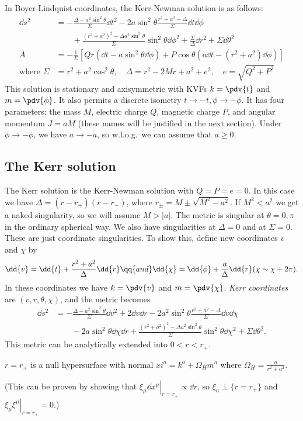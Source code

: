 \documentclass{jknotes}
\begin{document}
In Boyer-Lindquist coordinates, the Kerr-Newman solution is as follows:
\begin{align}
    \dd{s}^2 &= - \frac{\Delta-a^2\sin^2\theta}{\Sigma}\dd{t}^2 - 2a\sin^2\theta\frac{r^2+a^2-\Delta}{\Sigma}\dd{t}\dd{\phi} \\
             &\qquad + \frac{(r^2+a^2)^2 - \Delta a^2\sin^2\theta}{\Sigma}\sin^2\theta\dd{\phi}^2 + \frac{\Sigma}{\Delta}\dd{r}^2 + \Sigma\dd{\theta}^2 \\
    A &= - \frac{1}{\Sigma}\left[Qr(\dd{t}-a\sin^2\theta\dd{\phi}) + P\cos\theta(a\dd{t}-(r^2+a^2)\dd{\phi})\right] \\
    \text{where } \Sigma &= r^2 + a^2\cos^2\theta,\quad \Delta = r^2-2Mr + a^2 + e^2,\quad e=\sqrt{Q^2+P^2}
\end{align}
This solution is stationary and axisymmetric with KVFs \(k=\pdv{t}\) and \(m=\pdv{\phi}\). It also permits a discrete isometry \(t\to-t,\phi\to-\phi\). It has four parameters: the mass \(M\), electric charge \(Q\), magnetic charge \(P\), and angular momentum \(J=aM\) (these names will be justified in the next section). Under \(\phi\to-\phi\), we have \(a\to-a\), so w.l.o.g.\ we can assume that \(a\ge0\).

\subsection{The Kerr solution}
The Kerr solution is the Kerr-Newman solution with \(Q=P=e=0\). In this case we have \(\Delta = (r-r_+)(r-r_-)\), where \(r_\pm = M\pm\sqrt{M^2-a^2}\). If \(M^2<a^2\) we get a naked singularity, so we will assume \(M>|a|\). The metric is singular at \(\theta=0,\pi\) in the ordinary spherical way. We also have singularities at \(\Delta=0\) and at \(\Sigma=0\). These are just coordinate singularities. To show this, define new coordinates \(v\) and \(\chi\) by
\begin{equation}
    \dd{v} = \dd{t}+\frac{r^2+a^2}{\Delta}\dd{r} \qq{and} \dd{\chi}=\dd{\phi} + \frac{a}{\Delta}\dd{r} (\chi\sim\chi+2\pi).
\end{equation}
In these coordinates we have \(k=\pdv{v}\) and \(m=\pdv{\chi}\). \emph{Kerr coordinates} are \((v,r,\theta,\chi)\), and the metric becomes
\begin{align}
    \dd{s}^2 &= - \frac{\Delta-a^2\sin^2\theta}{\Sigma}\dd{v}^2 + 2\dd{v}\dd{r}-2a^2\sin^2\theta\frac{r^2+a^2-\Delta}{\Sigma}\dd{v}\dd{\chi} \\
             &\qquad -2a\sin^2\theta\dd{\chi}\dd{r} + \frac{(r^2+a^2)^2-\Delta a^2\sin^2\theta}{\Sigma}\sin^2\theta\dd{\chi}^2+\Sigma\dd{\theta}^2.
\end{align}
This metric can be analytically extended into \(0<r<r_+\).
\begin{lemma}
    \(r=r_+\) is a null hypersurface with normal \(xi^a=k^a + \Omega_H m^a\) where \(\Omega_H = \frac{a}{r^2+a^2}\).
\end{lemma}
(This can be proven by showing that \(\left.\xi_\mu\dd{x}^\mu\right|_{r=r_+} \propto \dd{r}\), so \(\xi_a \perp \{r=r_+\}\) and \(\left.\xi_\mu\xi^\mu\right|_{r=r_+} = 0\).)
\end{document}

